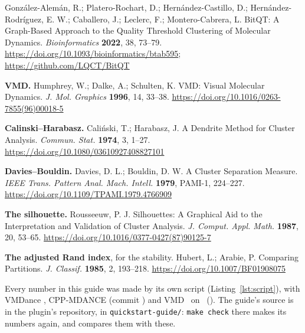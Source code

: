 \documentclass[11pt,letterpaper]{article}
\newcommand{\cmd}[1]{\texttt{#1}}
\begin{document}
{\begin{enumerate}[label={[\arabic*]},leftmargin=*,itemsep=0.3ex]
  Gonz\'alez-Alem\'an, R.; Platero-Rochart, D.; Hern\'andez-Castillo, D.;
  Hern\'andez-Rodr\'iguez, E. W.; Caballero, J.; Leclerc, F.;
  Montero-Cabrera, L. BitQT: A Graph-Based Approach to the Quality Threshold
  Clustering of Molecular Dynamics. \emph{Bioinformatics} \textbf{2022}, 38,
  73--79. \url{https://doi.org/10.1093/bioinformatics/btab595};
  \url{https://github.com/LQCT/BitQT}
\item \textbf{VMD.} Humphrey, W.; Dalke, A.; Schulten, K. VMD: Visual
  Molecular Dynamics. \emph{J. Mol. Graphics} \textbf{1996}, 14, 33--38.
  \url{https://doi.org/10.1016/0263-7855(96)00018-5}
\item \textbf{Calinski--Harabasz.} Cali\'nski, T.; Harabasz, J. A Dendrite
  Method for Cluster Analysis. \emph{Commun. Stat.} \textbf{1974}, 3, 1--27.
  \url{https://doi.org/10.1080/03610927408827101}
\item \textbf{Davies--Bouldin.} Davies, D. L.; Bouldin, D. W. A Cluster
  Separation Measure. \emph{IEEE Trans. Pattern Anal. Mach. Intell.}
  \textbf{1979}, PAMI-1, 224--227. \url{https://doi.org/10.1109/TPAMI.1979.4766909}
\item \textbf{The silhouette.} Rousseeuw, P. J. Silhouettes: A Graphical Aid to
  the Interpretation and Validation of Cluster Analysis. \emph{J. Comput.
  Appl. Math.} \textbf{1987}, 20, 53--65.
  \url{https://doi.org/10.1016/0377-0427(87)90125-7}
\item \textbf{The adjusted Rand index}, for the stability. Hubert, L.; Arabie,
  P. Comparing Partitions. \emph{J. Classif.} \textbf{1985}, 2, 193--218.
  \url{https://doi.org/10.1007/BF01908075}
\end{enumerate}
}

\vfill
{\footnotesize\color{muted}
Every number in this guide was made by its own script
(Listing~\ref{lst:script}), with VMDance \qsVersion, CPP-MDANCE (commit
\qsBackendCommit) and VMD \qsVMD\ on \qsArch\ (\qsMachine). The guide's
source is in the plugin's repository, in \cmd{quickstart-guide/}: \cmd{make
check} there makes its numbers again, and compares them with these.\par}
\end{document}
